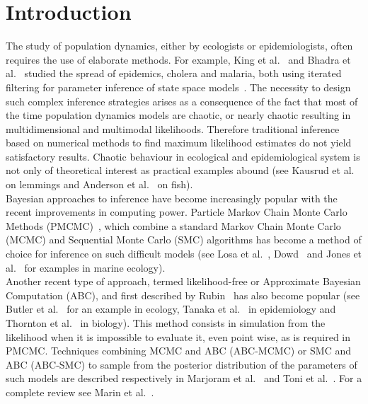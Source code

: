 \documentclass{article}
\begin{document}
	\listoffigures
	\listoftables
	\tableofcontents
	
	\clearpage
	\section{Introduction}
	The study of population dynamics, either by ecologists or epidemiologists, often requires the use of elaborate methods. For example, King et al.~\cite{king2008inapparent} and Bhadra et al.~\cite{bhadra2011malaria} studied the spread of epidemics, cholera and malaria, both using iterated filtering for parameter inference of state space models~\cite{ionides2006inference}. The necessity to design such complex inference strategies arises as a consequence of the fact that most of the time population dynamics models are chaotic, or nearly chaotic resulting in multidimensional and multimodal likelihoods. Therefore traditional inference based on numerical methods to find maximum likelihood estimates do not yield satisfactory results. Chaotic behaviour in ecological and epidemiological system is not only of theoretical interest as practical examples abound (see Kausrud et al.~\cite{kausrud2008linking} on lemmings and Anderson et al.~\cite{anderson2008fishing} on fish). \\
	
	Bayesian approaches to inference have become increasingly popular with the recent improvements in computing power. Particle Markov Chain Monte Carlo Methods (PMCMC)~\cite{andrieu2010particle}, which combine a standard Markov Chain Monte Carlo (MCMC) and Sequential Monte Carlo (SMC) algorithms has become a method of choice for inference on such difficult models (see Losa et al.~\cite{losa2003sequential}, Dowd~\cite{dowd2006sequential} and Jones et al.~\cite{jones2010bayesian} for examples in marine ecology). \\
	
	Another recent type of approach, termed likelihood-free or Approximate Bayesian Computation (ABC), and first described by Rubin~\cite{rubin1984bayesianly} has also become popular (see Butler et al.~\cite{butler57latent} for an example in ecology, Tanaka et al.~\cite{tanaka2006using} in epidemiology and Thornton et al.~\cite{thornton2006approximate} in biology). This method consists in simulation from the likelihood when it is impossible to evaluate it, even point wise, as is required in PMCMC. Techniques combining MCMC and ABC (ABC-MCMC) or SMC and ABC (ABC-SMC) to sample from the posterior distribution of the parameters of such models are described respectively in Marjoram et al.~\cite{marjoram2003markov} and Toni et al.~\cite{toni2009approximate}. For a complete review see Marin et al.~\cite{marin2012approximate}. \\
	
\end{document}
